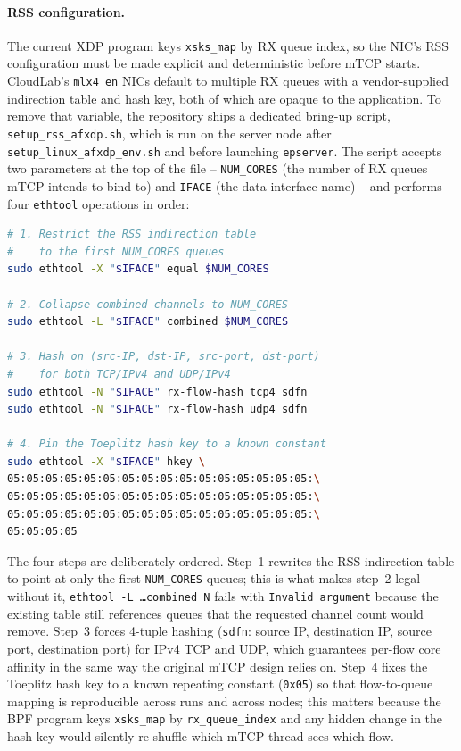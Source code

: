 \documentclass[10pt, letterpaper, twocolumn]{article}
\begin{document}
\paragraph{RSS configuration.} The current XDP program keys \texttt{xsks\_map} by RX queue index, so the NIC's RSS configuration must be made explicit and deterministic before mTCP starts. CloudLab's \texttt{mlx4\_en} NICs default to multiple RX queues with a vendor-supplied indirection table and hash key, both of which are opaque to the application. To remove that variable, the repository ships a dedicated bring-up script, \texttt{setup\_rss\_afxdp.sh}, which is run on the server node after \texttt{setup\_linux\_afxdp\_env.sh} and before launching \texttt{epserver}. The script accepts two parameters at the top of the file -- \texttt{NUM\_CORES} (the number of RX queues mTCP intends to bind to) and \texttt{IFACE} (the data interface name) -- and performs four \texttt{ethtool} operations in order:
\begin{lstlisting}[language=bash]
# 1. Restrict the RSS indirection table
#    to the first NUM_CORES queues
sudo ethtool -X "$IFACE" equal $NUM_CORES

# 2. Collapse combined channels to NUM_CORES
sudo ethtool -L "$IFACE" combined $NUM_CORES

# 3. Hash on (src-IP, dst-IP, src-port, dst-port)
#    for both TCP/IPv4 and UDP/IPv4
sudo ethtool -N "$IFACE" rx-flow-hash tcp4 sdfn
sudo ethtool -N "$IFACE" rx-flow-hash udp4 sdfn

# 4. Pin the Toeplitz hash key to a known constant
sudo ethtool -X "$IFACE" hkey \
05:05:05:05:05:05:05:05:05:05:05:05:05:05:05:05:\
05:05:05:05:05:05:05:05:05:05:05:05:05:05:05:05:\
05:05:05:05:05:05:05:05:05:05:05:05:05:05:05:05:\
05:05:05:05
\end{lstlisting}
The four steps are deliberately ordered. Step~1 rewrites the RSS indirection table to point at only the first \texttt{NUM\_CORES} queues; this is what makes step~2 legal -- without it, \texttt{ethtool -L \dots combined N} fails with \texttt{Invalid argument} because the existing table still references queues that the requested channel count would remove. Step~3 forces 4-tuple hashing (\texttt{sdfn}: source IP, destination IP, source port, destination port) for IPv4 TCP and UDP, which guarantees per-flow core affinity in the same way the original mTCP design relies on. Step~4 fixes the Toeplitz hash key to a known repeating constant (\texttt{0x05}) so that flow-to-queue mapping is reproducible across runs and across nodes; this matters because the BPF program keys \texttt{xsks\_map} by \texttt{rx\_queue\_index} and any hidden change in the hash key would silently re-shuffle which mTCP thread sees which flow.
\end{document}
